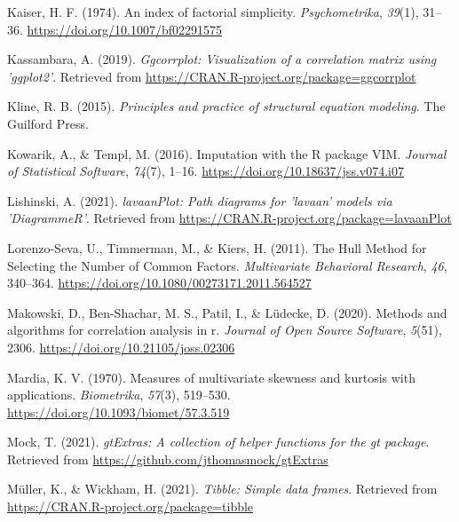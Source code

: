 \documentclass[
  english,
  man]{apa6}
\newlength{\cslhangindent}
\newlength{\cslentryspacingunit} %
\newenvironment{CSLReferences}[2] %
 {%
  \setlength{\parindent}{0pt}
  \ifodd #1
  \let\oldpar\par
  \def\par{\hangindent=\cslhangindent\oldpar}
  \fi
  \setlength{\parskip}{#2\cslentryspacingunit}
 }%
 {}
\begin{document}
\begin{CSLReferences}{1}{0}
\leavevmode{}%
Kaiser, H. F. (1974). An index of factorial simplicity. \emph{Psychometrika}, \emph{39}(1), 31--36. \url{https://doi.org/10.1007/bf02291575}

\leavevmode{}%
Kassambara, A. (2019). \emph{Ggcorrplot: Visualization of a correlation matrix using 'ggplot2'}. Retrieved from \url{https://CRAN.R-project.org/package=ggcorrplot}

\leavevmode{}%
Kline, R. B. (2015). \emph{Principles and practice of structural equation modeling}. {The Guilford Press}.

\leavevmode{}%
Kowarik, A., \& Templ, M. (2016). Imputation with the {R} package {VIM}. \emph{Journal of Statistical Software}, \emph{74}(7), 1--16. \url{https://doi.org/10.18637/jss.v074.i07}

\leavevmode{}%
Lishinski, A. (2021). \emph{lavaanPlot: Path diagrams for 'lavaan' models via 'DiagrammeR'}. Retrieved from \url{https://CRAN.R-project.org/package=lavaanPlot}

\leavevmode{}%
Lorenzo-Seva, U., Timmerman, M., \& Kiers, H. (2011). The {Hull Method} for {Selecting} the {Number} of {Common Factors}. \emph{Multivariate Behavioral Research}, \emph{46}, 340--364. \url{https://doi.org/10.1080/00273171.2011.564527}

\leavevmode{}%
Makowski, D., Ben-Shachar, M. S., Patil, I., \& Lüdecke, D. (2020). Methods and algorithms for correlation analysis in r. \emph{Journal of Open Source Software}, \emph{5}(51), 2306. \url{https://doi.org/10.21105/joss.02306}

\leavevmode{}%
Mardia, K. V. (1970). Measures of multivariate skewness and kurtosis with applications. \emph{Biometrika}, \emph{57}(3), 519--530. \url{https://doi.org/10.1093/biomet/57.3.519}

\leavevmode{}%
Mock, T. (2021). \emph{gtExtras: A collection of helper functions for the gt package}. Retrieved from \url{https://github.com/jthomasmock/gtExtras}

\leavevmode{}%
Müller, K., \& Wickham, H. (2021). \emph{Tibble: Simple data frames}. Retrieved from \url{https://CRAN.R-project.org/package=tibble}


\end{CSLReferences}
\end{document}
